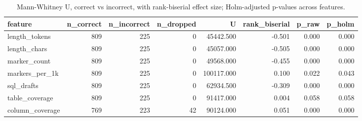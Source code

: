 \begin{table}[htbp]
\caption{Mann-Whitney U, correct vs incorrect, with rank-biserial effect size; Holm-adjusted p-values across features.}
\label{tab:task2_mannwhitney}
\begin{tabular}{lrrrrrrr}
\toprule
feature & n\_correct & n\_incorrect & n\_dropped & U & rank\_biserial & p\_raw & p\_holm \\
\midrule
length_tokens & 809 & 225 & 0 & 45442.500 & -0.501 & 0.000 & 0.000 \\
length_chars & 809 & 225 & 0 & 45057.000 & -0.505 & 0.000 & 0.000 \\
marker_count & 809 & 225 & 0 & 49568.000 & -0.455 & 0.000 & 0.000 \\
markers_per_1k & 809 & 225 & 0 & 100117.000 & 0.100 & 0.022 & 0.043 \\
sql_drafts & 809 & 225 & 0 & 62934.500 & -0.309 & 0.000 & 0.000 \\
table_coverage & 809 & 225 & 0 & 91417.000 & 0.004 & 0.058 & 0.058 \\
column_coverage & 769 & 223 & 42 & 90124.000 & 0.051 & 0.000 & 0.000 \\
\bottomrule
\end{tabular}
\end{table}
